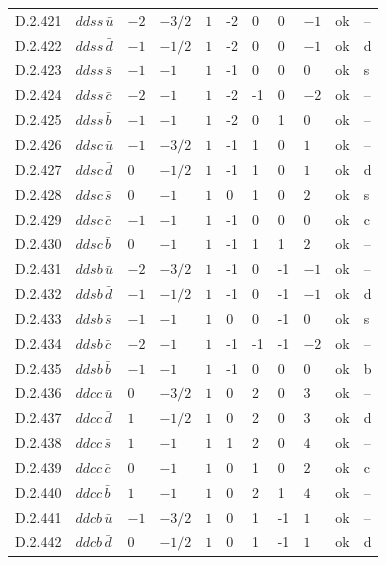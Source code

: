 {\begin{longtable}{@{}llllllllll>{\raggedright\arraybackslash}p{2.0cm}@{}}
D.2.421 & $ddss\,\bar{u}$ & $-2$ & $-3/2$ & $1$ & -2 & 0 & 0 & $-1$ & ok & -- \\
D.2.422 & $ddss\,\bar{d}$ & $-1$ & $-1/2$ & $1$ & -2 & 0 & 0 & $-1$ & ok & d \\
D.2.423 & $ddss\,\bar{s}$ & $-1$ & $-1$ & $1$ & -1 & 0 & 0 & $0$ & ok & s \\
D.2.424 & $ddss\,\bar{c}$ & $-2$ & $-1$ & $1$ & -2 & -1 & 0 & $-2$ & ok & -- \\
D.2.425 & $ddss\,\bar{b}$ & $-1$ & $-1$ & $1$ & -2 & 0 & 1 & $0$ & ok & -- \\
D.2.426 & $ddsc\,\bar{u}$ & $-1$ & $-3/2$ & $1$ & -1 & 1 & 0 & $1$ & ok & -- \\
D.2.427 & $ddsc\,\bar{d}$ & $0$ & $-1/2$ & $1$ & -1 & 1 & 0 & $1$ & ok & d \\
D.2.428 & $ddsc\,\bar{s}$ & $0$ & $-1$ & $1$ & 0 & 1 & 0 & $2$ & ok & s \\
D.2.429 & $ddsc\,\bar{c}$ & $-1$ & $-1$ & $1$ & -1 & 0 & 0 & $0$ & ok & c \\
D.2.430 & $ddsc\,\bar{b}$ & $0$ & $-1$ & $1$ & -1 & 1 & 1 & $2$ & ok & -- \\
D.2.431 & $ddsb\,\bar{u}$ & $-2$ & $-3/2$ & $1$ & -1 & 0 & -1 & $-1$ & ok & -- \\
D.2.432 & $ddsb\,\bar{d}$ & $-1$ & $-1/2$ & $1$ & -1 & 0 & -1 & $-1$ & ok & d \\
D.2.433 & $ddsb\,\bar{s}$ & $-1$ & $-1$ & $1$ & 0 & 0 & -1 & $0$ & ok & s \\
D.2.434 & $ddsb\,\bar{c}$ & $-2$ & $-1$ & $1$ & -1 & -1 & -1 & $-2$ & ok & -- \\
D.2.435 & $ddsb\,\bar{b}$ & $-1$ & $-1$ & $1$ & -1 & 0 & 0 & $0$ & ok & b \\
D.2.436 & $ddcc\,\bar{u}$ & $0$ & $-3/2$ & $1$ & 0 & 2 & 0 & $3$ & ok & -- \\
D.2.437 & $ddcc\,\bar{d}$ & $1$ & $-1/2$ & $1$ & 0 & 2 & 0 & $3$ & ok & d \\
D.2.438 & $ddcc\,\bar{s}$ & $1$ & $-1$ & $1$ & 1 & 2 & 0 & $4$ & ok & -- \\
D.2.439 & $ddcc\,\bar{c}$ & $0$ & $-1$ & $1$ & 0 & 1 & 0 & $2$ & ok & c \\
D.2.440 & $ddcc\,\bar{b}$ & $1$ & $-1$ & $1$ & 0 & 2 & 1 & $4$ & ok & -- \\
D.2.441 & $ddcb\,\bar{u}$ & $-1$ & $-3/2$ & $1$ & 0 & 1 & -1 & $1$ & ok & -- \\
D.2.442 & $ddcb\,\bar{d}$ & $0$ & $-1/2$ & $1$ & 0 & 1 & -1 & $1$ & ok & d \\

\end{longtable}}
